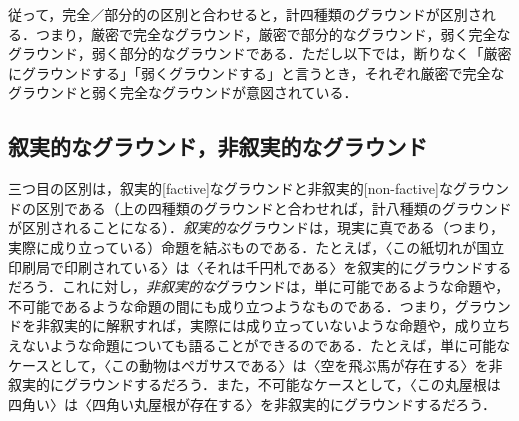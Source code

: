 \documentclass[twoside,14Q,uplatex,dvipdfmx]{jsarticle}
\theoremstyle{definition}
\begin{document}
従って，完全／部分的の区別と合わせると，計四種類のグラウンドが区別される．つまり，厳密で完全なグラウンド，厳密で部分的なグラウンド，弱く完全なグラウンド，弱く部分的なグラウンドである．ただし以下では，断りなく「厳密にグラウンドする」「弱くグラウンドする」と言うとき，それぞれ厳密で完全なグラウンドと弱く完全なグラウンドが意図されている．

\subsection{叙実的なグラウンド，非叙実的なグラウンド}\label{factivenonfactive}
三つ目の区別は，叙実的[factive]なグラウンドと非叙実的[non-factive]なグラウンドの区別である（上の四種類のグラウンドと合わせれば，計八種類のグラウンドが区別されることになる）．\emph{叙実的な}グラウンドは，現実に真である（つまり，実際に成り立っている）命題を結ぶものである．たとえば，〈この紙切れが国立印刷局で印刷されている〉は〈それは千円札である〉を叙実的にグラウンドするだろう．これに対し，\emph{非叙実的な}グラウンドは，単に可能であるような命題や，不可能であるような命題の間にも成り立つようなものである．つまり，グラウンドを非叙実的に解釈すれば，実際には成り立っていないような命題や，成り立ちえないような命題についても語ることができるのである．たとえば，単に可能なケースとして，〈この動物はペガサスである〉は〈空を飛ぶ馬が存在する〉を非叙実的にグラウンドするだろう．また，不可能なケースとして，〈この丸屋根は四角い〉は〈四角い丸屋根が存在する〉を非叙実的にグラウンドするだろう．
\end{document}
